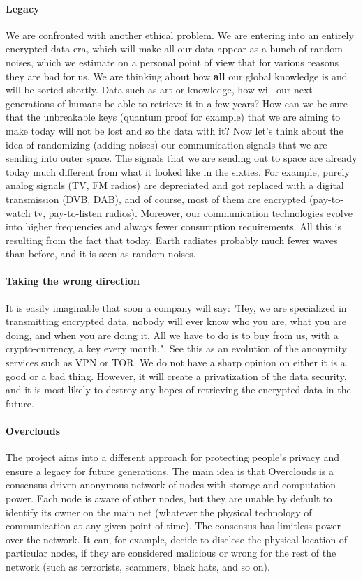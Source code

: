 \paragraph{Legacy} We are confronted with another ethical problem. We are entering into an entirely encrypted data era, which will make all our data appear as a bunch of random noises, which we estimate on a personal point of view that for various reasons they are bad for us. We are thinking about how \textbf{all} our global knowledge is and will be sorted shortly. Data such as art or knowledge, how will our next generations of humans be able to retrieve it in a few years? How can we be sure that the unbreakable keys (quantum proof for example) that we are aiming to make today will not be lost and so the data with it?
Now let's think about the idea of randomizing (adding noises) our communication signals that we are sending into outer space. The signals that we are sending out to space are already today much different from what it looked like in the sixties. For example, purely analog signals (TV, FM radios) are depreciated and got replaced with a digital transmission (DVB, DAB), and of course, most of them are encrypted (pay-to-watch tv, pay-to-listen radios). Moreover, our communication technologies evolve into higher frequencies and always fewer consumption requirements. All this is resulting from the fact that today, Earth radiates probably much fewer waves than before, and it is seen as random noises.

\paragraph{Taking the wrong direction} It is easily imaginable that soon a company will say: "Hey, we are specialized in transmitting encrypted data, nobody will ever know who you are, what you are doing, and when you are doing it. All we have to do is to buy from us, with a crypto-currency, a key every month.". See this as an evolution of the anonymity services such as VPN or TOR\cite{TorTor}. We do not have a sharp opinion on either it is a good or a bad thing. However, it will create a privatization of the data security, and it is most likely to destroy any hopes of retrieving the encrypted data in the future.

\paragraph{Overclouds} The project aims into a different approach for protecting people's privacy and ensure a legacy for future generations.
The main idea is that Overclouds is a consensus-driven anonymous network of nodes with storage and computation power. Each node is aware of other nodes, but they are unable by default to identify its owner on the main net (whatever the physical technology of communication at any given point of time). The consensus has limitless power over the network. It can, for example, decide to disclose the physical location of particular nodes, if they are considered malicious or wrong for the rest of the network (such as terrorists, scammers, black hats, and so on).

